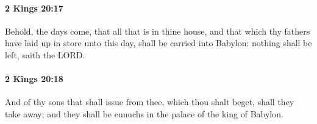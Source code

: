 		\paragraph{2 Kings 20:17} %
			\label{2KINGS-20-17}

			Behold, the days come, that all that is in thine house, and that which thy fathers have laid up in store unto this day, shall be carried into Babylon: nothing shall be left, saith the LORD.


		\paragraph{2 Kings 20:18} %
			\label{2KINGS-20-18}

			And of thy sons that shall issue from thee, which thou shalt beget, shall they take away; and they shall be eunuchs in the palace of the king of Babylon.


